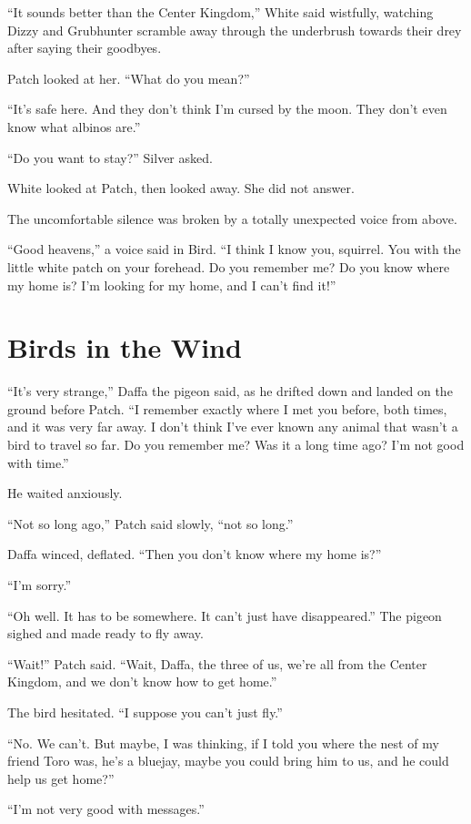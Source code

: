 \documentclass[12pt]{memoir}
\begin{document}
“It sounds better than the Center Kingdom,” White said wistfully,
watching Dizzy and Grubhunter scramble away through the underbrush
towards their drey after saying their goodbyes.

Patch looked at her. “What do you mean?”

“It’s safe here. And they don’t think I’m cursed by the moon. They
don’t even know what albinos are.”

“Do you want to stay?” Silver asked.

White looked at Patch, then looked away. She did not answer.

The uncomfortable silence was broken by a totally unexpected voice
from above.

“Good heavens,” a voice said in Bird. “I think I know you,
squirrel. You with the little white patch on your forehead. Do you
remember me? Do you know where my home is? I’m looking for my home,
and I can’t find it!”


\section{Birds in the Wind}

“It’s very strange,” Daffa the pigeon said, as he drifted down and
landed on the ground before Patch. “I remember exactly where I met you
before, both times, and it was very far away. I don’t think I’ve ever
known any animal that wasn’t a bird to travel so far. Do you remember
me? Was it a long time ago? I’m not good with time.”

He waited anxiously.

“Not so long ago,” Patch said slowly, “not so long.”

Daffa winced, deflated. “Then you don’t know where my home is?”

“I’m sorry.”

“Oh well. It has to be somewhere. It can’t just have disappeared.”
The pigeon sighed and made ready to fly away.

“Wait!” Patch said. “Wait, Daffa, the three of us, we’re all from the
Center Kingdom, and we don’t know how to get home.”

The bird hesitated. “I suppose you can’t just fly.”

“No. We can’t. But maybe, I was thinking, if I told you where the nest
of my friend Toro was, he’s a bluejay, maybe you could bring him to
us, and he could help us get home?”

“I’m not very good with messages.”
\end{document}

